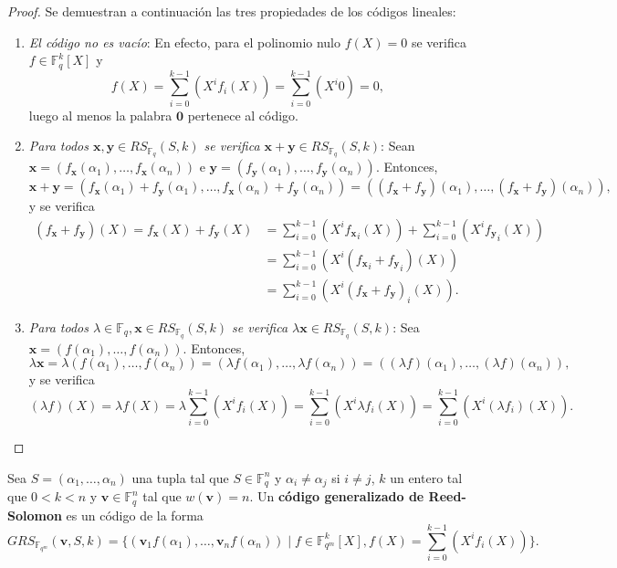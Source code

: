 \begin{proof}
	Se demuestran a continuación las tres propiedades de los códigos lineales:
	\begin{enumerate}
		\item \textit{El código no es vacío}: En efecto, para el polinomio nulo $f(X) = 0$ se verifica $f \in \mathbb{F}_q^k[X]$ y 
		\[f(X) = \sum_{i=0}^{k-1}(X^i f_i(X)) = \sum_{i=0}^{k-1}(X^i 0) = 0,\]
		luego al menos la palabra $\textbf{0}$ pertenece al código.
		\item \textit{Para todos $\textbf{x}, \textbf{y} \in RS_{\mathbb{F}_q}(S, k)$ se verifica $\textbf{x} + \textbf{y} \in RS_{\mathbb{F}_q}(S, k)$}: Sean $\textbf{x} = (f_\textbf{x}(\alpha_1), \dots, f_\textbf{x}(\alpha_n))$ e $\textbf{y} = (f_\textbf{y}(\alpha_1), \dots, f_\textbf{y}(\alpha_n))$. Entonces,
		\[\textbf{x} + \textbf{y} = (f_\textbf{x}(\alpha_1) + f_\textbf{y}(\alpha_1), \dots, f_\textbf{x}(\alpha_n) + f_\textbf{y}(\alpha_n)) = ((f_\textbf{x} + f_\textbf{y})(\alpha_1), \dots, (f_\textbf{x} + f_\textbf{y})(\alpha_n)),\]
		y se verifica
		\begin{align*}
			(f_\textbf{x} + f_\textbf{y})(X) = f_\textbf{x}(X) + f_\textbf{y}(X) &= \sum_{i=0}^{k-1}(X^i {f_\textbf{x}}_i(X)) + \sum_{i=0}^{k-1}(X^i {f_\textbf{y}}_i(X))\\
			&= \sum_{i=0}^{k-1}(X^i({f_\textbf{x}}_i + {f_\textbf{y}}_i)(X))\\
			&= \sum_{i=0}^{k-1}(X^i(f_\textbf{x} + f_\textbf{y})_i(X)).
		\end{align*}
		\item \textit{Para todos $\lambda \in \mathbb{F}_q, \textbf{x} \in RS_{\mathbb{F}_q}(S, k)$ se verifica $\lambda\textbf{x} \in RS_{\mathbb{F}_q}(S, k)$}: Sea $\textbf{x} = (f(\alpha_1), \dots, f(\alpha_n))$. Entonces,
		\[\lambda\textbf{x} = \lambda(f(\alpha_1), \dots, f(\alpha_n)) = (\lambda f(\alpha_1), \dots, \lambda f(\alpha_n)) = ((\lambda f)(\alpha_1), \dots, (\lambda f)(\alpha_n)),\]
		y se verifica
		\[(\lambda f)(X) = \lambda f(X) = \lambda \sum_{i=0}^{k-1}(X^i f_i(X)) = \sum_{i=0}^{k-1}(X^i \lambda f_i(X)) = \sum_{i=0}^{k-1}(X^i (\lambda f_i)(X)).\]
	\end{enumerate}
\end{proof}

\begin{definition}
	Sea $S = (\alpha_1, \dots, \alpha_n)$ una tupla tal que $S \in \mathbb{F}_q^n$ y $\alpha_i \neq \alpha_j$ si $i \neq j$, $k$ un entero tal que $0 < k < n$ y $\textbf{v} \in \mathbb{F}_q^n$ tal que $w(\textbf{v}) = n$. Un \textbf{código generalizado de Reed-Solomon} es un código de la forma
	\[GRS_{\mathbb{F}_{q^m}}(\textbf{v}, S, k) = \big\{(\textbf{v}_1f(\alpha_1), \dots, \textbf{v}_nf(\alpha_n)) \mid f \in \mathbb{F}_{q^m}^k[X], f(X) = \sum_{i=0}^{k-1}(X^i f_i(X)) \big\}.\]
\end{definition}

